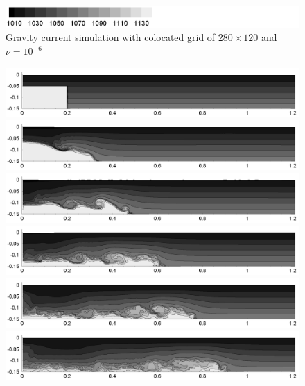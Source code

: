\begin{figure}[htbp]
\begin{center}
\includegraphics[scale=0.55]{../figures/colocated/Fig9case/label.png}
    \caption{Gravity current simulation with colocated grid of $280 \times 120$ and $\nu=10^{-6}$}
    \label{fig:280-120-075-VE-6-Surf0}
  \end{center}
\end{figure}



\begin{figure}[htbp]
  \begin{center}    \includegraphics[scale=0.55]{../figures/colocated/Fig9case/280-120-0075-VE-7-Surf0/01.png}    \includegraphics[scale=0.55]{../figures/colocated/Fig9case/280-120-0075-VE-7-Surf0/02.png}
\includegraphics[scale=0.55]{../figures/colocated/Fig9case/280-120-0075-VE-7-Surf0/03.png}
\includegraphics[scale=0.55]{../figures/colocated/Fig9case/280-120-0075-VE-7-Surf0/04.png}    \includegraphics[scale=0.55]{../figures/colocated/Fig9case/280-120-0075-VE-7-Surf0/05.png}
\includegraphics[scale=0.55]{../figures/colocated/Fig9case/280-120-0075-VE-7-Surf0/06.png}

\end{center}
\end{figure}
